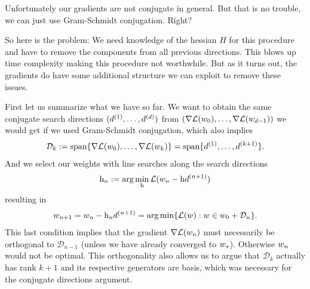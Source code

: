 Unfortunately our gradients are not conjugate in general. But that is no
trouble, we can just use Gram-Schmidt conjugation. Right?

So here is the problem: We need knowledge of the hessian \(H\) for this
procedure and have to remove the components from all previous directions. This
blows up time complexity making this procedure not worthwhile. But as it turns
out, the gradients do have some additional structure we can exploit to remove
these issues.

First let us summarize what we have so far. We want to obtain the same conjugate
search directions \((d^{(1)},\dots,d^{(d)})\) from
\((\nabla\mathcal{L}(w_0),\dots,\nabla\mathcal{L}(w_{d-1}))\)
we would get if we used Gram-Schmidt conjugation, which also implies
\begin{align*}
	\mathcal{D}_k := \text{span}\{\nabla\mathcal{L}(w_0),\dots,\nabla\mathcal{L}(w_k)\}
	= \text{span}\{d^{(1)},\dots,d^{(k+1)}\}.
\end{align*}
And we select our weights with line searches along the search directions
\begin{align*}
	\text{h}_n := \arg\min_{\text{h}} \mathcal{L}(w_n - \text{h} d^{(n+1)})
\end{align*}
resulting in
\begin{align*}
	w_{n+1} = w_n - \text{h}_n d^{(n+1)}
	= \arg\min\{ \mathcal{L}(w) : w\in w_0 + \mathcal{D}_n\}.
\end{align*}
This last condition implies that the gradient \(\nabla\mathcal{L}(w_n)\)
must necessarily be orthogonal to \(\mathcal{D}_{n-1}\) (unless we have already
converged to \(w_*\)). Otherwise \(w_n\) would not be optimal. This
orthogonality also allows us to argue that \(\mathcal{D}_k\) actually has rank
\(k+1\) and its respective generators are basis, which was necessary for the
conjugate directions argument.

